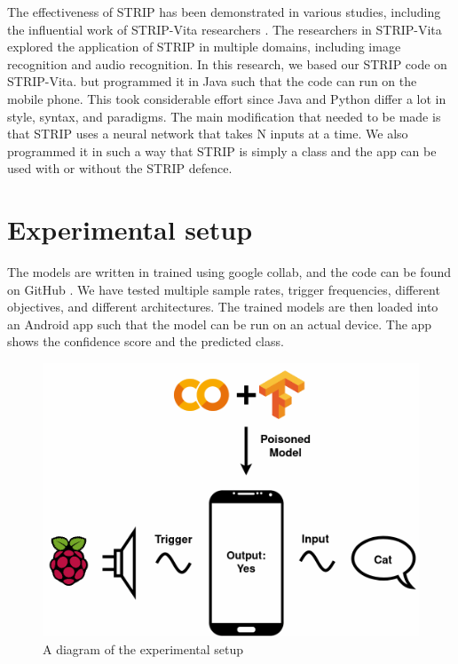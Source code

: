 \documentclass{report}
\theoremstyle{definition}
\theoremstyle{remark}
\begin{document}
The effectiveness of STRIP has been demonstrated in various studies, including the influential work of STRIP-Vita researchers \cite{StripVita}. The researchers in STRIP-Vita explored the application of STRIP in multiple domains, including image recognition and audio recognition. In this research, we based our STRIP code on STRIP-Vita. \cite{StripVita} but programmed it in Java such that the code can run on the mobile phone. This took considerable effort since Java and Python differ a lot in style, syntax, and paradigms. The main modification that needed to be made is that STRIP uses a neural network that takes N inputs at a time. We also programmed it in such a way that STRIP is simply a class and the app can be used with or without the STRIP defence.


\chapter{Experimental setup}
The models are written in trained using google collab, and the code can be found on GitHub \cite{GH}. We have tested multiple sample rates, trigger frequencies, different objectives, and different architectures. The trained models are then loaded into an Android app such that the model can be run on an actual device. The app shows the confidence score and the predicted class.

\begin{figure}[!hbt]
    \centering
    \includegraphics[scale=0.2]{img/AttackDiagram.drawio.png}
    \caption{A diagram of the experimental setup}
    \label{fig:experimental-setup}
\end{figure}
\end{document}
